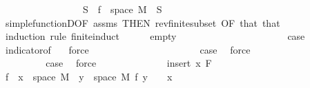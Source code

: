 \begin{isabellebody}
\ \ \ \ \ \ \ \ \ \ \ \ \ \ \ \ \ {\isachardoublequoteopen}S\ {\isasymsubseteq}\ f\ {\isacharbackquote}{\kern0pt}\ space\ M{\isachardoublequoteclose}\ \ S\ \isamarkupfalse%
\ simple{\isacharunderscore}{\kern0pt}functionD{\isacharparenleft}{\kern0pt}{}{\isacharparenright}{\kern0pt}{\isacharbrackleft}{\kern0pt}OF\ assms{\isacharparenleft}{\kern0pt}{}{\isacharparenright}{\kern0pt}{\isacharcomma}{\kern0pt}\ THEN\ rev{\isacharunderscore}{\kern0pt}finite{\isacharunderscore}{\kern0pt}subset{\isacharcomma}{\kern0pt}\ OF\ that{\isacharbrackright}{\kern0pt}\ that\ \isanewline
\ \ \isamarkupfalse%
\ {\isacharparenleft}{\kern0pt}induction\ rule{\isacharcolon}{\kern0pt}\ finite{\isacharunderscore}{\kern0pt}induct{\isacharparenright}{\kern0pt}\isanewline
\ \ \ \ \isamarkupfalse%
\ empty\isanewline
\ \ \ \ \isacommand{{\isacharbraceleft}{\kern0pt}}\isamarkupfalse%
\isanewline
\ \ \ \ \ \ \isamarkupfalse%
\ {}\isanewline
\ \ \ \ \ \ \isamarkupfalse%
\ \isamarkupfalse%
\ {\isacharquery}{\kern0pt}case\ \isamarkupfalse%
\ indicator{\isacharbrackleft}{\kern0pt}of\ {\isachardoublequoteopen}{\isacharbraceleft}{\kern0pt}{\isacharbraceright}{\kern0pt}{\isachardoublequoteclose}{\isacharbrackright}{\kern0pt}\ \isamarkupfalse%
\ force\isanewline
\ \ \ \ \isamarkupfalse%
\isanewline
\ \ \ \ \ \ \isamarkupfalse%
\ {}\isanewline
\ \ \ \ \ \ \isamarkupfalse%
\ \isamarkupfalse%
\ {\isacharquery}{\kern0pt}case\ \isamarkupfalse%
\ force\ \isanewline
\ \ \ \ \isamarkupfalse%
\isanewline
\ \ \ \ \ \ \isamarkupfalse%
\ {}\isanewline
\ \ \ \ \ \ \isamarkupfalse%
\ \isamarkupfalse%
\ {\isacharquery}{\kern0pt}case\ \isamarkupfalse%
\ force\ \isanewline
\ \ \ \ \isacommand{{\isacharbraceright}{\kern0pt}}\isamarkupfalse%
\isanewline
\ \ \isamarkupfalse%
\isanewline
\ \ \ \ \isamarkupfalse%
\ {\isacharparenleft}{\kern0pt}insert\ x\ F{\isacharparenright}{\kern0pt}\isanewline
\ \ \ \ \isamarkupfalse%
\ {\isachardoublequoteopen}{\isacharparenleft}{\kern0pt}f\ {\isacharminus}{\kern0pt}{\isacharbackquote}{\kern0pt}\ {\isacharbraceleft}{\kern0pt}x{\isacharbraceright}{\kern0pt}\ {\isasyminter}\ space\ M{\isacharparenright}{\kern0pt}\ {\isasymsubseteq}\ {\isacharbraceleft}{\kern0pt}y\ {\isasymin}\ space\ M{\isachardot}{\kern0pt}\ f\ y\ {\isasymnoteq}\ {}{\isacharbraceright}{\kern0pt}{\isachardoublequoteclose}\ \ {\isachardoublequoteopen}x\ {\isasymnoteq}\ {}{\isachardoublequoteclose}\ \isamarkupfalse%

\end{isabellebody}
